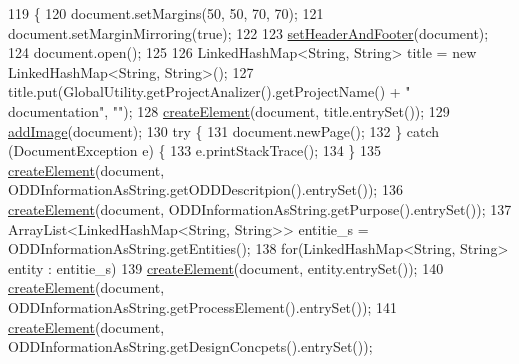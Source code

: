 \begin{DoxyCode}
119                                                    \{
120         document.setMargins(50, 50, 70, 70);
121         document.setMarginMirroring(\textcolor{keyword}{true});
122         
123         \hyperlink{classit_1_1isislab_1_1masonassisteddocumentation_1_1mason_1_1control_1_1_pdf_rtf_generator_add96cb1e39ece24ace1e42aae99082a0}{setHeaderAndFooter}(document);     
124         document.open();
125         
126         LinkedHashMap<String, String> title = \textcolor{keyword}{new} LinkedHashMap<String, String>();
127         title.put(GlobalUtility.getProjectAnalizer().getProjectName() + \textcolor{stringliteral}{" documentation"}, \textcolor{stringliteral}{""});
128         \hyperlink{classit_1_1isislab_1_1masonassisteddocumentation_1_1mason_1_1control_1_1_pdf_rtf_generator_ad3127f275f1af4f9d92f314fb3f29f51}{createElement}(document, title.entrySet());
129         \hyperlink{classit_1_1isislab_1_1masonassisteddocumentation_1_1mason_1_1control_1_1_pdf_rtf_generator_a256d403130ef860861402da49b373042}{addImage}(document);
130         \textcolor{keywordflow}{try} \{
131             document.newPage();
132         \} \textcolor{keywordflow}{catch} (DocumentException e) \{
133             e.printStackTrace();
134         \}
135         \hyperlink{classit_1_1isislab_1_1masonassisteddocumentation_1_1mason_1_1control_1_1_pdf_rtf_generator_ad3127f275f1af4f9d92f314fb3f29f51}{createElement}(document, ODDInformationAsString.getODDDescritpion().entrySet());
136         \hyperlink{classit_1_1isislab_1_1masonassisteddocumentation_1_1mason_1_1control_1_1_pdf_rtf_generator_ad3127f275f1af4f9d92f314fb3f29f51}{createElement}(document, ODDInformationAsString.getPurpose().entrySet());
137         ArrayList<LinkedHashMap<String, String>> entitie\_s = ODDInformationAsString.getEntities();
138         \textcolor{keywordflow}{for}(LinkedHashMap<String, String> entity : entitie\_s)
139             \hyperlink{classit_1_1isislab_1_1masonassisteddocumentation_1_1mason_1_1control_1_1_pdf_rtf_generator_ad3127f275f1af4f9d92f314fb3f29f51}{createElement}(document, entity.entrySet());
140         \hyperlink{classit_1_1isislab_1_1masonassisteddocumentation_1_1mason_1_1control_1_1_pdf_rtf_generator_ad3127f275f1af4f9d92f314fb3f29f51}{createElement}(document, ODDInformationAsString.getProcessElement().entrySet());
141         \hyperlink{classit_1_1isislab_1_1masonassisteddocumentation_1_1mason_1_1control_1_1_pdf_rtf_generator_ad3127f275f1af4f9d92f314fb3f29f51}{createElement}(document, ODDInformationAsString.getDesignConcpets().entrySet());

\end{DoxyCode}
